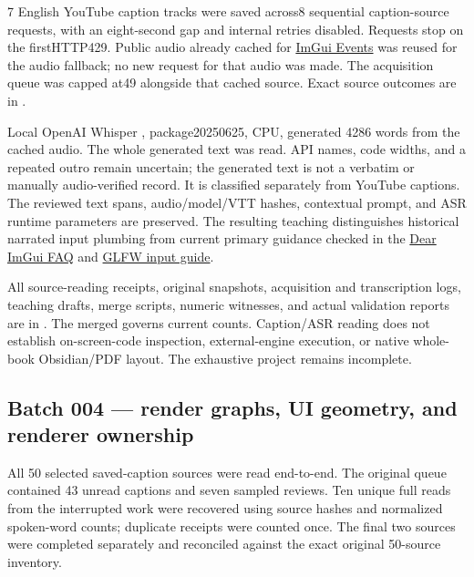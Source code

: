 7 English YouTube caption tracks were saved across8 sequential caption-source requests, with an eight-second gap and internal retries disabled. Requests stop on the firstHTTP429. Public audio already cached for \href{https://www.youtube.com/watch?v=yBP1gSbQPPM}{ImGui Events} was reused for the audio fallback; no new request for that audio was made. The acquisition queue was capped at49 alongside that cached source. Exact source outcomes are in .

Local OpenAI Whisper , package20250625, CPU, generated 4286 words from the cached audio. The whole generated text was read. API names, code widths, and a repeated outro remain uncertain; the generated text is not a verbatim or manually audio-verified record. It is classified separately from YouTube captions. The reviewed text spans, audio/model/VTT hashes, contextual prompt, and ASR runtime parameters are preserved. The resulting teaching distinguishes historical narrated input plumbing from current primary guidance checked in the \href{https://github.com/ocornut/imgui/blob/master/docs/FAQ.md}{Dear ImGui FAQ} and \href{https://www.glfw.org/docs/latest/input_guide.html}{GLFW input guide}.

All source-reading receipts, original snapshots, acquisition and transcription logs, teaching drafts, merge scripts, numeric witnesses, and actual validation reports are in . The merged  governs current counts. Caption/ASR reading does not establish on-screen-code inspection, external-engine execution, or native whole-book Obsidian/PDF layout. The exhaustive project remains incomplete.

\subsection{Batch 004 --- render graphs, UI geometry, and renderer ownership}\label{appendix-877738f6f4d2-batch-004-render-graphs-ui-geometry-and-renderer-ownership}

\hypertarget{appendix-877738f6f4d2-batch-004-render-graphs-ui-geometry-and-renderer-ownership}{}

All 50 selected saved-caption sources were read end-to-end. The original queue contained 43 unread captions and seven sampled reviews. Ten unique full reads from the interrupted work were recovered using source hashes and normalized spoken-word counts; duplicate receipts were counted once. The final two sources were completed separately and reconciled against the exact original 50-source inventory.

